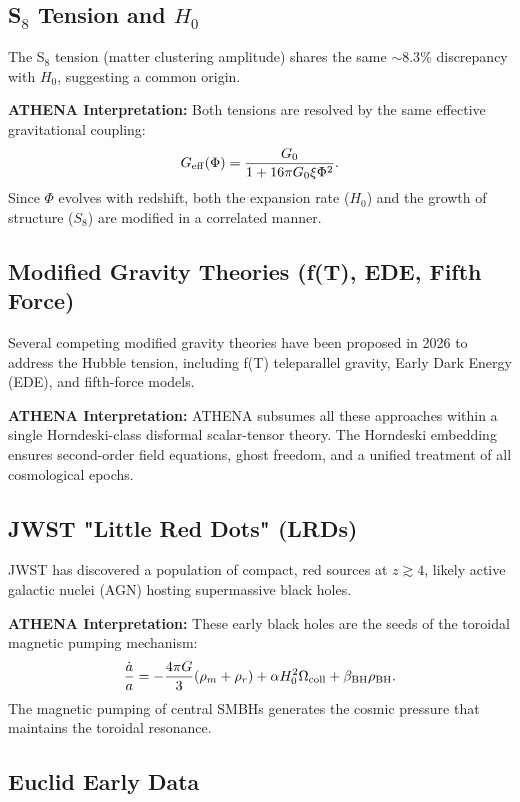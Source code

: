 \documentclass[12pt,oneside]{book}
\begin{document}
\subsection{S$_8$ Tension and $H_0$}

The S$_8$ tension (matter clustering amplitude) shares the same $\sim 8.3\%$ discrepancy with $H_0$, suggesting a common origin.

\textbf{ATHENA Interpretation:} Both tensions are resolved by the same effective gravitational coupling:
\[
G_{\rm eff}(\Phi) = \frac{G_0}{1 + 16\pi G_0 \xi \Phi^2}.
\]
Since $\Phi$ evolves with redshift, both the expansion rate ($H_0$) and the growth of structure ($S_8$) are modified in a correlated manner.

\subsection{Modified Gravity Theories (f(T), EDE, Fifth Force)}

Several competing modified gravity theories have been proposed in 2026 to address the Hubble tension, including f(T) teleparallel gravity, Early Dark Energy (EDE), and fifth-force models.

\textbf{ATHENA Interpretation:} ATHENA subsumes all these approaches within a single Horndeski-class disformal scalar-tensor theory. The Horndeski embedding ensures second-order field equations, ghost freedom, and a unified treatment of all cosmological epochs.

\subsection{JWST "Little Red Dots" (LRDs)}

JWST has discovered a population of compact, red sources at $z \gtrsim 4$, likely active galactic nuclei (AGN) hosting supermassive black holes.

\textbf{ATHENA Interpretation:} These early black holes are the seeds of the toroidal magnetic pumping mechanism:
\[
\frac{\dot{a}}{a} = -\frac{4\pi G}{3}(\rho_m + \rho_r) + \alpha H_0^2 \Omega_{\rm coll} + \beta_{\rm BH}\rho_{\rm BH}.
\]
The magnetic pumping of central SMBHs generates the cosmic pressure that maintains the toroidal resonance.

\subsection{Euclid Early Data}
\end{document}
